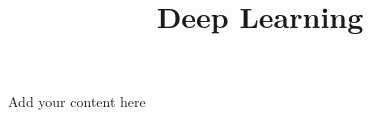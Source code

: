 \title{Deep Learning}
\label{chp:deep-learning}
\author{}
\institute{}
\maketitle



Add your content here




